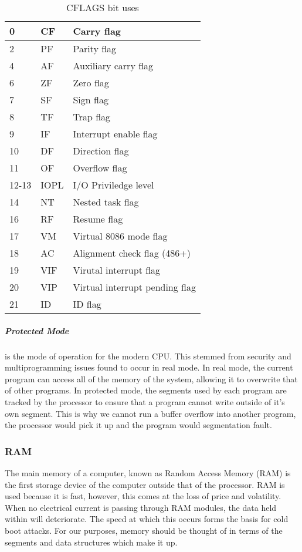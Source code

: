 \documentclass[a4paper,11pt,draft]{article}
\begin{document}
\begin{itemize}
\begin{table}[htb]
\begin{tabular}{| l | l | l |}
									0   &   CF &     Carry flag \\ \hline
									2   &   PF   &   Parity flag \\ \hline
									4   &   AF   &   Auxiliary carry flag \\ \hline
									6   &   ZF   &   Zero flag \\ \hline
									7   &   SF   &   Sign flag \\ \hline
									8   &   TF   &   Trap flag \\ \hline
									9   &   IF   &   Interrupt enable flag \\ \hline
									10  &   DF   &   Direction flag \\ \hline
									11  &   OF   &   Overflow flag \\ \hline
									12-13 & IOPL &   I/O Priviledge level \\ \hline
									14  &   NT   &   Nested task flag \\ \hline
									16  &   RF   &   Resume flag \\ \hline
									17  &   VM   &   Virtual 8086 mode flag \\ \hline
									18  &   AC   &   Alignment check flag (486+) \\ \hline
									19  &   VIF  &   Virutal interrupt flag \\ \hline
									20  &   VIP  &   Virtual interrupt pending flag \\ \hline
									21  &   ID   &   ID flag \\ \hline
							\end{tabular}
								\caption{CFLAGS bit uses}
								\label{tab:CFLAGSBits}
							\end{table}
				\end{itemize}
			\subparagraph{Protected Mode} 
				is the mode of operation for the modern CPU. 
				This stemmed from security and multiprogramming issues found to occur in real mode. 
				In real mode, the current program can access all of the memory of the system, allowing it to overwrite that of other programs. 
				In protected mode, the segments used by each program are tracked by the processor to ensure that a program cannot write outside of it's own segment. 
				This is why we cannot run a buffer overflow into another program, the processor would pick it up and the program would segmentation fault. 
				\subsubsection{RAM}
					The main memory of a computer, known as Random Access Memory (RAM) is the first storage device of the computer outside that of the processor. 
					RAM is used because it is fast, however, this comes at the loss of price and volatility. 
					When no electrical current is passing through RAM modules, the data held within will deteriorate. 
					The speed at which this occurs forms the basis for cold boot attacks. %
					For our purposes, memory should be thought of in terms of the segments and data structures which make it up. 
\end{document}
